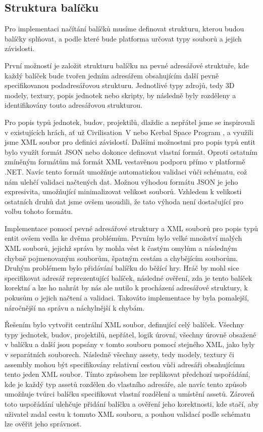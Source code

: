 \subsection{Struktura balíčku}
\label{sec:packagestructure}
Pro implementaci načítání balíčků musíme definovat strukturu, kterou budou balíčky splňovat, a podle které bude platforma určovat typy souborů a jejich závislosti.

První možností je založit strukturu balíčku na pevné adresářové struktuře, kde každý balíček bude tvořen jedním adresářem obsahujícím další pevně specifikovanou podadresářovou strukturu. Jednotlivé typy zdrojů, tedy 3D modely, textury, popis jednotek nebo skripty, by následně byly rozděleny a identifikovány touto adresářovou strukturou. 

Pro popis typů jednotek, budov, projektilů, dlaždic a nepřátel jsme se inspirovali v existujících hrách, ať už Civilisation~V \citep{site:civ5} nebo Kerbal Space Program \citep{site:ksp}, a využili jsme XML soubor pro definici závislostí. Dalšími možnostmi pro popis typů entit bylo využít formát JSON nebo dokonce definovat vlastní formát. Oproti ostatním zmíněným formátům má formát XML vestavěnou podporu přímo v platformě .NET. Navíc tento formát umožňuje automatickou validaci vůči schématu, což nám ulehčí  validaci načtených dat. Možnou výhodou formátu JSON je jeho expresivita, umožňující minimalizovat velikost souborů. Vzhledem k velikosti ostatních druhů dat jsme ovšem usoudili, že tato výhoda není dostačující pro volbu tohoto formátu. 

Implementace pomocí pevné adresářové struktury a XML souborů pro popis typů entit ovšem vedla ke dvěma problémům. Prvním bylo velké množství malých XML souborů, jejichž správa by mohla vést k častým omylům a následným chybně pojmenovaným souborům, špatným cestám a chybějícím souborům. Druhým problémem bylo přidávání balíčku do běžící hry. Hráč by mohl sice specifikovat adresář reprezentující balíček, následné ověření, zda je tento balíček korektní a lze ho nahrát by nás ale nutilo k procházení adresářové struktury, k pokusům o jejich načtení a validaci. Takováto implementace by byla pomalejší, náročnější na správu a náchylnější k chybám. 

Řešením bylo vytvořit centrální XML soubor, definující celý balíček. Všechny typy jednotek, budov, projektilů, nepřátel, logik úrovní, všechny úrovně obsažené v balíčku a další jsou popsány v tomto souboru pomocí stejného XML, jako byly v separátních souborech. Následně všechny assety, tedy modely, textury či assembly mohou být specifikovány relativní cestou vůči adresáři obsahujícímu tento jeden XML soubor. Tímto způsobem lze replikovat předchozí uspořádání, kde je každý typ assetů rozdělen do vlastního adresáře, ale navíc tento způsob umožňuje tvůrci balíčku specifikovat vlastní rozdělení a umístění assetů. Zároveň toto uspořádání ulehčuje přidání balíčku a ověření jeho korektnosti, kde stačí, aby uživatel zadal cestu k tomuto XML souboru, a pouhou validací podle schématu lze ověřit jeho správnost.

